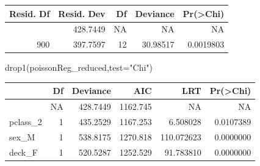 \documentclass[
  letterpaper,
  DIV=11,
  numbers=noendperiod]{scrartcl}
\newenvironment{Shaded}{\begin{snugshade}}{\end{snugshade}}
\newcommand{\AttributeTok}[1]{\textcolor[rgb]{0.40,0.45,0.13}{#1}}
\newcommand{\CommentTok}[1]{\textcolor[rgb]{0.37,0.37,0.37}{#1}}
\newcommand{\DocumentationTok}[1]{\textcolor[rgb]{0.37,0.37,0.37}{\textit{#1}}}
\newcommand{\FunctionTok}[1]{\textcolor[rgb]{0.28,0.35,0.67}{#1}}
\newcommand{\NormalTok}[1]{\textcolor[rgb]{0.00,0.23,0.31}{#1}}
\newcommand{\OtherTok}[1]{\textcolor[rgb]{0.00,0.23,0.31}{#1}}
\newcommand{\SpecialCharTok}[1]{\textcolor[rgb]{0.37,0.37,0.37}{#1}}
\newcommand{\StringTok}[1]{\textcolor[rgb]{0.13,0.47,0.30}{#1}}
\begin{document}
\begin{longtable}[]{@{}rrrrr@{}}
\toprule\noalign{}
Resid. Df & Resid. Dev & Df & Deviance & Pr(\textgreater Chi) \\
\midrule\noalign{}
\endhead
\bottomrule\noalign{}
\endlastfoot
912 & 428.7449 & NA & NA & NA \\
900 & 397.7597 & 12 & 30.98517 & 0.0019803 \\
\end{longtable}

\begin{Shaded}
\begin{Highlighting}[]
\FunctionTok{drop1}\NormalTok{(poissonReg\_reduced,}\AttributeTok{test=}\StringTok{"Chi"}\NormalTok{)}
\end{Highlighting}
\end{Shaded}

\begin{longtable}[]{@{}lrrrrr@{}}
\toprule\noalign{}
& Df & Deviance & AIC & LRT & Pr(\textgreater Chi) \\
\midrule\noalign{}
\endhead
\bottomrule\noalign{}
\endlastfoot
& NA & 428.7449 & 1162.745 & NA & NA \\
pclass\_2 & 1 & 435.2529 & 1167.253 & 6.508028 & 0.0107389 \\
sex\_M & 1 & 538.8175 & 1270.818 & 110.072623 & 0.0000000 \\
deck\_F & 1 & 520.5287 & 1252.529 & 91.783810 & 0.0000000 \\
\end{longtable}

\begin{Shaded}
\end{Shaded}
\end{document}
